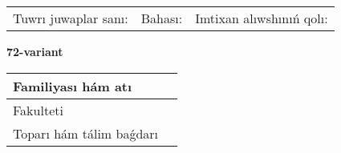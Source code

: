 \documentclass{article}
\begin{document}
\vspace{1cm}

\begin{tabular}{lll}
Tuwrı juwaplar sanı: \underline{\hspace{1.5cm}} & 
Bahası: \underline{\hspace{1.5cm}} & 
Imtixan alıwshınıń qolı: \underline{\hspace{2cm}} \\
\end{tabular}

\egroup

\newpage


\textbf{72-variant}\\

\bgroup
\def\arraystretch{1.6} %

\begin{tabular}{|m{5.7cm}|m{9.5cm}|}
\hline
Familiyası hám atı & \\
\hline
Fakulteti  & \\
\hline
Toparı hám tálim baǵdarı  & \\
\hline
\end{tabular}

\vspace{1cm}
\end{document}
